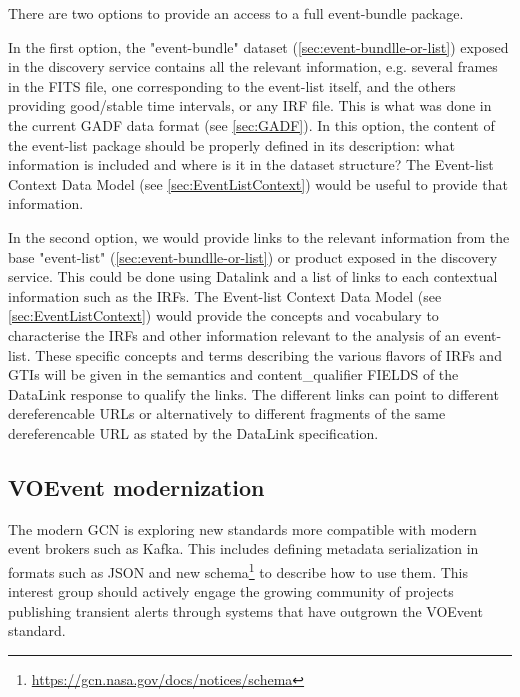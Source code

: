 \documentclass[11pt,a4paper]{ivoa}
\begin{document}
{There are two options to provide an access to a full event-bundle package.

In the first option, the "event-bundle" dataset (\ref{sec:event-bundlle-or-list}) exposed in the discovery service  contains all the relevant information, e.g. several frames in the \gls{FITS} file, one corresponding to the event-list itself, and the others providing good/stable time intervals, or any \gls{IRF} file. This is what was done in the current \gls{GADF} data format (see \ref{sec:GADF}). In this option, the content of the event-list package should be properly defined in its description: what information is included and where is it in the dataset structure? The Event-list Context Data Model (see \ref{sec:EventListContext}) would be useful to provide that information.

In the second option, we would provide links to the relevant information from the base "event-list" (\ref{sec:event-bundlle-or-list}) or product exposed in the discovery service. This could be done using Datalink and a list of links to each contextual information such as the \gls{IRF}s. The Event-list Context Data Model (see \ref{sec:EventListContext}) would provide the concepts and vocabulary to characterise the \gls{IRF}s and other information relevant to the analysis of an event-list. These specific concepts and terms describing the various flavors of \gls{IRF}s and \gls{GTI}s will be given in the semantics and content\_qualifier FIELDS of the DataLink response to qualify the links. The different links can point to different
dereferencable URLs or alternatively to different fragments of the same dereferencable URL as stated by the DataLink specification.

\subsection{VOEvent modernization}\label{sec:voevent_he}

The modern GCN is exploring new standards more compatible with modern event brokers such as Kafka. This includes defining metadata serialization in formats such as JSON and new schema\footnote{\url{https://gcn.nasa.gov/docs/notices/schema}} to describe how to use them.  This interest group should actively engage the growing community of projects publishing transient alerts through systems that have outgrown the VOEvent standard.  


\printglossaries

}
\end{document}
